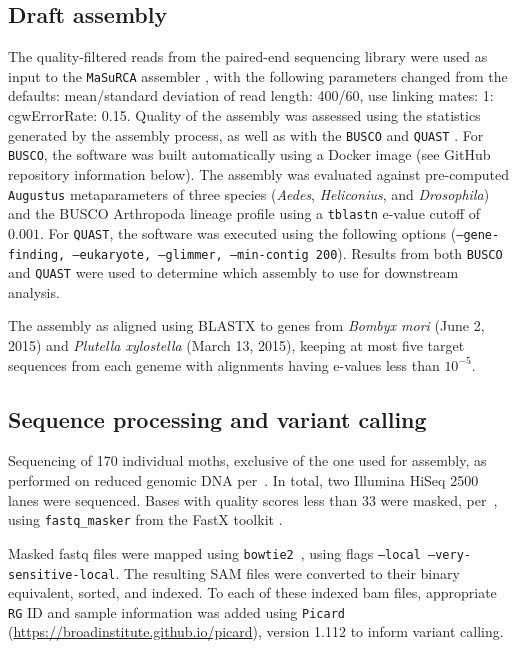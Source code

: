 \documentclass[smallextended]{svjour3}
\begin{document}
\subsection*{Draft assembly}

The quality-filtered reads from the paired-end sequencing library were used as input to
the \texttt{MaSuRCA} assembler \citep[][versions 2.3.2, 3.1.3]{Zimin:2013kn}, with the
following parameters changed from the defaults: mean/standard deviation of read
length: 400/60, use linking mates: 1: cgwErrorRate: 0.15.  Quality of the
assembly was assessed using the statistics generated by the assembly process, as
well as with the \texttt{BUSCO} \citep[][version 1.1b1]{Simao:2015kk} and
\texttt{QUAST} \citep[][version 3.2]{Gurevich:2013je}. For \texttt{BUSCO}, the
software was built automatically using a Docker image (see GitHub repository
information below). The assembly was evaluated against pre-computed
\texttt{Augustus} \citep{Stanke:2003eo} metaparameters of three species
(\textit{Aedes}, \textit{Heliconius}, and \textit{Drosophila}) and the BUSCO
Arthropoda lineage profile using a \texttt{tblastn} e-value cutoff of $0.001$.
For \texttt{QUAST}, the software was executed using the following options
(\texttt{--gene-finding, --eukaryote, --glimmer, --min-contig 200}).  Results
from both \texttt{BUSCO} and \texttt{QUAST} were used to determine which
assembly to use for downstream analysis.

The assembly as aligned using BLASTX \citep[][version 2.2.30+]{Camacho:2009fc}
to genes from \textit{Bombyx mori} (June 2, 2015) and  \textit{Plutella
xylostella} (March 13, 2015), keeping at most five target sequences from each
geneme with alignments having e-values less than $10^{-5}$.

\subsection*{Sequence processing and variant calling} Sequencing of 170
individual moths, exclusive of the one used for assembly,  as performed on
reduced genomic DNA per~\cite{PARCHMAN:2012ca}. In total, two Illumina HiSeq
2500 lanes were sequenced. Bases with quality scores less than 33 were masked,
per~\cite{Yun:2014dn},  using \texttt{fastq\_masker} from the FastX toolkit
\citep[][version 0.0.14]{citeulike:9103573}.

Masked fastq files were mapped using \texttt{bowtie2}~\citep[][version
2.2.4]{Langmead:2012jh}, using flags  \texttt{--local --very-sensitive-local}.
The resulting  SAM files were converted to their binary equivalent, sorted,
and indexed. To each of these indexed bam files, appropriate \texttt{RG} ID and
sample information was added using \texttt{Picard}
(\url{https://broadinstitute.github.io/picard}), version 1.112 to inform variant
calling.
\end{document}
